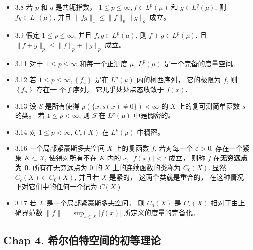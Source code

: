 \begin{itemize}
\item 3.8 若 $p$ 和 $q$ 是共轭指数， $1 \leqslant p \leqslant \infty, f \in L^{p}(\mu)$ 和 $g \in L^{q}(\mu)$, 则 $f g \in L^{1}(\mu)$, 并且 $\|f g\|_{1} \leqslant\|f\|_{p}\|g\|_{q}$ 成立。

\item 3.9 假定 $1 \leqslant p \leqslant \infty$, 并且 $f, g \in L^{p}(\mu)$, 则 $f+g \in L^{p}(\mu)$, 且 $\|f+g\|_{p} \leqslant\|f\|_{p}+\|g\|_{p}$ 成立。

\item 3.11 对于 $1 \leqslant p \leqslant \infty$ 和每一个正测度 $\mu$, $L^{p}(\mu)$ 是一个完备的度量空间。

\item 3.12 若 $1 \leqslant p \leqslant \infty,\left\{f_{n}\right\}$ 是在 $L^{p}(\mu)$ 内的柯西序列， 它的极限为 $f$, 则 $\left\{f_{n}\right\}$ 存在一 个子序列， 它几乎处处点态收敛于 $f(x)$.

\item 3.13 设 $S$ 是所有使得 $\mu(\{x: s(x) \neq 0\})<\infty$ 的 $X$ 上的复可测简单函数 $s$ 的类。 若 $1 \leqslant p<\infty$, 则 $S$ 在 $L^{p}(\mu)$ 中是稠密的。

\item 3.14 对 $1 \leqslant p<\infty$, $C_{c}(X)$ 在 $L^{p}(\mu)$ 中稠密。

\item 3.16 一个局部紧豪斯多夫空间 $X$ 上的复函数 $f$, 若对每一个 $\varepsilon>0$, 存在一个紧集 $K \subset X$, 使得对所有不在 $K$ 内的 $x$, $|f(x)|<\varepsilon$ 成立， 则称 $f$ 在\textbf{无穷远点为 0}. 所有在无穷远点为 0 的 $X$ 上的连续函数的类称为 $C_{0}(X)$. 显然 $C_{c}(X) \subset C_{0}(X)$, 并且若 $X$ 是紧的， 这两个类就是重合的， 在这种情况下对它们中的任何一个记为 $C(X)$.

\item 3.17 若 $X$ 是一个局部紧豪斯多夫空间， 则 $C_{0}(X)$ 是 $C_{c}(X)$ 相对于由上确界范数 $\|f\|=\sup _{x \in X}|f(x)|$ 所定义的度量的完备化。
\end{itemize}

\subsection{Chap 4. 希尔伯特空间的初等理论}

